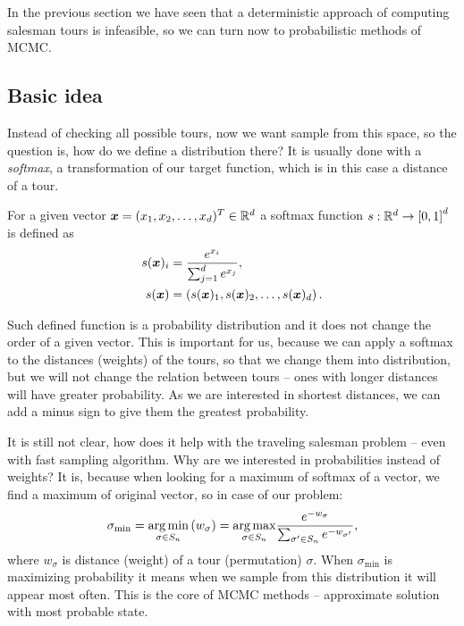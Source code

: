 In the previous section we have seen that a deterministic approach of computing salesman tours is infeasible, so we can turn now to probabilistic methods of MCMC. 

\subsection{Basic idea}
	Instead of checking all possible tours, now we want sample from this space, so the question is, how do we define a distribution there? It is usually done with a \textit{softmax}, a transformation of our target function, which is in this case a distance of a tour.
	\begin{definition}
		For a given vector $\bm{x} = (x_1, x_2, \ldots, x_d)^T \in \mathbb{R}^d$ a softmax function $s: \mathbb{R}^d \rightarrow \left[0, 1\right]^d$ is defined as
		\begin{align*}
			s(\bm{x})_i &= \frac{e^{x_i}}{\sum_{j=1}^{d} e^{x_j}}, \\
			s(\bm{x}) &= \left( s(\bm{x})_1, s(\bm{x})_2, \ldots, s(\bm{x})_d \right).
		\end{align*}
	\end{definition}
	Such defined function is a probability distribution and it does not change the order of a given vector. This is important for us, because we can apply a softmax to the distances (weights) of the tours, so that we change them into distribution, but we will not change the relation between tours -- ones with longer distances will have greater probability. As we are interested in shortest distances, we can add a minus sign to give them the greatest probability.
	
	It is still not clear, how does it help with the traveling salesman problem -- even with fast sampling algorithm. Why are we interested in probabilities instead of weights? It is, because when looking for a maximum of softmax of a vector, we find a maximum of original vector, so in case of our problem:
	\begin{equation*}
		\sigma_{\min} = \underset{\sigma \in S_n}{\operatorname*{arg\,min}} \left( w_{\sigma} \right) = \underset{\sigma \in S_n}{\operatorname*{arg\,max}} \frac{e^{-w_{\sigma}}}{\sum_{\sigma' \in S_n} e^{-w_{\sigma'}}},
	\end{equation*}
	where $w_{\sigma}$ is distance (weight) of a tour (permutation) $\sigma$. When $\sigma_{\min}$ is maximizing probability it means when we sample from this distribution it will appear most often. This is the core of MCMC methods -- approximate solution with most probable state. 

